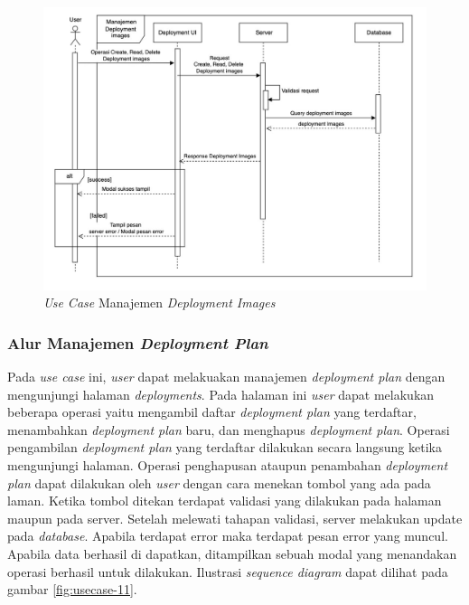 \begin{figure}[ht]
  \centering
  \includegraphics[width=1\textwidth]{resources/chapter-3/usecase/uc-10.jpg}
  \caption{\textit{Use Case} Manajemen \textit{Deployment Images}}
  \label{fig:usecase-10}
\end{figure}

\pagebreak

\subsubsection{Alur Manajemen \textit{Deployment Plan}}

Pada \textit{use case} ini, \textit{user} dapat melakuakan manajemen \textit{deployment plan} dengan mengunjungi halaman \textit{deployments}. Pada halaman ini \textit{user} dapat melakukan beberapa operasi yaitu mengambil daftar \textit{deployment plan} yang terdaftar, menambahkan \textit{deployment plan} baru, dan menghapus \textit{deployment plan}. Operasi pengambilan \textit{deployment plan} yang terdaftar dilakukan secara langsung ketika mengunjungi halaman. Operasi penghapusan ataupun penambahan \textit{deployment plan} dapat dilakukan oleh \textit{user} dengan cara menekan tombol yang ada pada laman. Ketika tombol ditekan terdapat validasi yang dilakukan pada halaman maupun pada server. Setelah melewati tahapan validasi, server melakukan update pada \textit{database}. Apabila terdapat error maka terdapat pesan error yang muncul. Apabila data berhasil di dapatkan, ditampilkan sebuah modal yang menandakan operasi berhasil untuk dilakukan. Ilustrasi \textit{sequence diagram} dapat dilihat pada gambar \ref{fig:usecase-11}.


